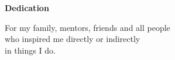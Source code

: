 
\newpage
\vspace*{0.9cm}
\begin{center}
{\bf \Huge Dedication}
\end{center}


\setlength{\baselineskip}{0.8cm}


\newenvironment{dedication}
  {%
   \vspace*{\stretch{1}}%
   \itshape             %
   \raggedleft          %
  }
  {\par %
   \vspace{\stretch{3}} %
   \clearpage           %
  }

\begin{dedication}
	\begin{adjustwidth}{8em}{8em}
		\begin{center}
			For my family, mentors, friends and all people \\
			who inspired me directly or indirectly \\
			in things I do.
		\end{center}
	\end{adjustwidth}
\end{dedication}


